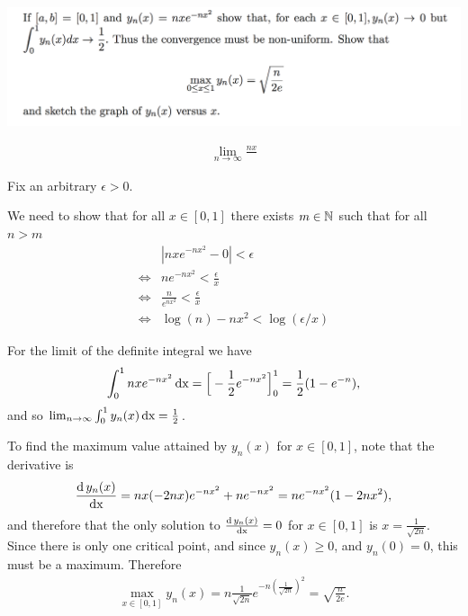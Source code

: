 \documentclass[12pt]{article}
\begin{document}
\includegraphics[width=450pt]{img/differential-equations-a1-1-1-b.png}\\
\begin{mdframed}
\begin{align*}
\lim_{n \to \infty} \frac{nx}{}
\end{align*}

Fix an arbitrary $\epsilon > 0$.

We need to show that for all $x \in [0,1]$ there exists $m \in \mathbb{N}$ such that for all $n > m$
\begin{align*}
       &|nxe^{-nx^2} - 0| < \epsilon\\
  \iff &ne^{-nx^2} < \frac{\epsilon}{x}\\
  \iff &\frac{n}{e^{nx^2}} < \frac{\epsilon}{x}\\
  \iff &\log(n) - nx^2 < \log(\epsilon/x)
\end{align*}

For the limit of the definite integral we have
\begin{align*}
  \int_0^1 nxe^{-nx^2} \operatorname{\text{dx}}
  = \Big[-\frac{1}{2}e^{-nx^2}\Big]_0^1 = \frac{1}{2}(1 - e^{-n}),
\end{align*}
and so $\lim_{n \to \infty} \int_0^1 y_n(x) \operatorname{\text{dx}} = \frac{1}{2}$.

To find the maximum value attained by $y_n(x)$ for $x \in [0,1]$, note that the
derivative is
\begin{align*}
  \frac{\operatorname{\text{d}} y_n(x)}{\operatorname{\text{dx}}} = nx(-2nx)e^{-nx^2} + ne^{-nx^2} = ne^{-nx^2}(1 - 2nx^2),
\end{align*}
and therefore that the only solution to $\frac{\operatorname{\text{d}} y_n(x)}{\operatorname{\text{dx}}} = 0$ for
$x \in [0,1]$ is $x = \frac{1}{\sqrt{2n}}$. Since there is only one critical
point, and since $y_n(x) \geq 0$, and $y_n(0) = 0$, this must be a
maximum. Therefore
\begin{align*}
  \max_{x \in [0,1]} y_n(x)
  = n\frac{1}{\sqrt{2n}}e^{-n(\frac{1}{\sqrt{2n}})^2}
  = \sqrt{\frac{n}{2e}}.
\end{align*}

\end{mdframed}
\end{document}
